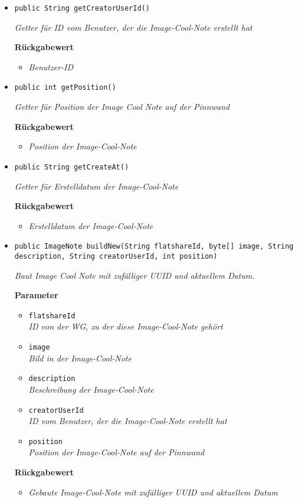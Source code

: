 \begin{itemize}
     \item{\texttt{public String getCreatorUserId()}}
     	
     	\textit{Getter für ID vom Benutzer, der die Image-Cool-Note erstellt hat}
     	
     	\textbf{Rückgabewert}
     	\begin{itemize}
     		\item\textit{Benutzer-ID}
     	\end{itemize}
     
     \item{\texttt{public int getPosition()}}
     	
     	\textit{Getter für Position der Image Cool Note auf der Pinnwand}
     	
     	\textbf{Rückgabewert}
     	\begin{itemize}
     		\item\textit{Position der Image-Cool-Note}
     	\end{itemize}
     
     \item{\texttt{public String getCreateAt()}}
     	
     	\textit{Getter für Erstelldatum der Image-Cool-Note}
     	
     	\textbf{Rückgabewert}
     	\begin{itemize}
     		\item\textit{Erstelldatum der Image-Cool-Note}
     	\end{itemize}
     
     \item{\texttt{public ImageNote buildNew(String flatshareId, byte[] image, String description, String creatorUserId, int position)}}
     	
     	\textit{Baut Image Cool Note mit zufälliger UUID und aktuellem Datum.}
     	
     	\textbf{Parameter}
     	\begin{itemize}
     		\item\texttt{flatshareId}\\
     		\textit{ID von der WG, zu der diese Image-Cool-Note gehört}
     		\item\texttt{image}\\
     		\textit{Bild in der Image-Cool-Note}
     		\item\texttt{description}\\
     		\textit{Beschreibung der Image-Cool-Note}
     		\item\texttt{creatorUserId}\\
     		\textit{ID vom Benutzer, der die Image-Cool-Note erstellt hat}
     		\item\texttt{position}\\
     		\textit{Position der Image-Cool-Note auf der Pinnwand}
     	\end{itemize}
     
     	\textbf{Rückgabewert}
     	\begin{itemize}
     		\item\textit{Gebaute Image-Cool-Note mit zufälliger UUID und aktuellem Datum}
     	\end{itemize}
     \end{itemize}
